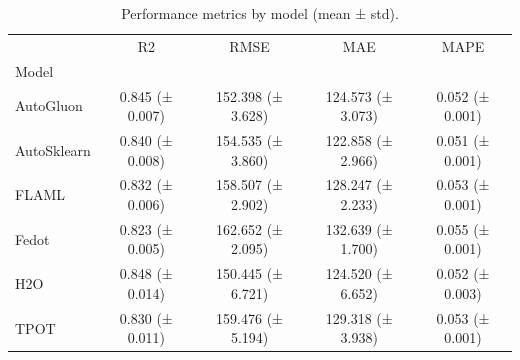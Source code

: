 \begin{table}
\caption{Performance metrics by model (mean ± std).}
\label{tab:summary_metrics}
\begin{tabular}{lcccc}
\toprule
 & R2 & RMSE & MAE & MAPE \\
Model &  &  &  &  \\
\midrule
AutoGluon & 0.845 (± 0.007) & 152.398 (± 3.628) & 124.573 (± 3.073) & 0.052 (± 0.001) \\
AutoSklearn & 0.840 (± 0.008) & 154.535 (± 3.860) & 122.858 (± 2.966) & 0.051 (± 0.001) \\
FLAML & 0.832 (± 0.006) & 158.507 (± 2.902) & 128.247 (± 2.233) & 0.053 (± 0.001) \\
Fedot & 0.823 (± 0.005) & 162.652 (± 2.095) & 132.639 (± 1.700) & 0.055 (± 0.001) \\
H2O & 0.848 (± 0.014) & 150.445 (± 6.721) & 124.520 (± 6.652) & 0.052 (± 0.003) \\
TPOT & 0.830 (± 0.011) & 159.476 (± 5.194) & 129.318 (± 3.938) & 0.053 (± 0.001) \\
\bottomrule
\end{tabular}
\end{table}
